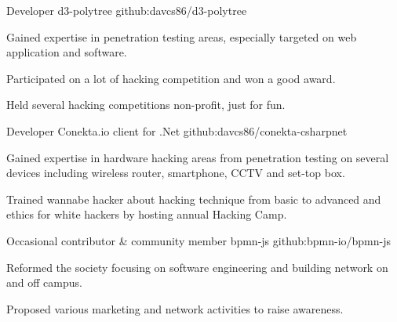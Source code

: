 


\begin{cventries}


\cventry
{Developer} %
{d3-polytree} %
{github:davcs86/d3-polytree} %
{ } %
{ %
	\begin{cvitems}
		\item {Gained expertise in penetration testing areas, especially targeted on web application and software.}
		\item {Participated on a lot of hacking competition and won a good award.}
		\item {Held several hacking competitions non-profit, just for fun.}
	\end{cvitems}
}


\cventry
{Developer} %
{Conekta.io client for .Net} %
{github:davcs86/conekta-csharpnet} %
{ } %
{ %
	\begin{cvitems}
		\item {Gained expertise in hardware hacking areas from penetration testing on several devices including wireless router, smartphone, CCTV and set-top box.}
		\item {Trained wannabe hacker about hacking technique from basic to advanced and ethics for white hackers by hosting annual Hacking Camp.}
	\end{cvitems}
}


\cventry
{Occasional contributor \& community member} %
{bpmn-js} %
{github:bpmn-io/bpmn-js} %
{ } %
{ %
	\begin{cvitems}
		\item {Reformed the society focusing on software engineering and building network on and off campus.}
		\item {Proposed various marketing and network activities to raise awareness.}
	\end{cvitems}
}


\end{cventries}

